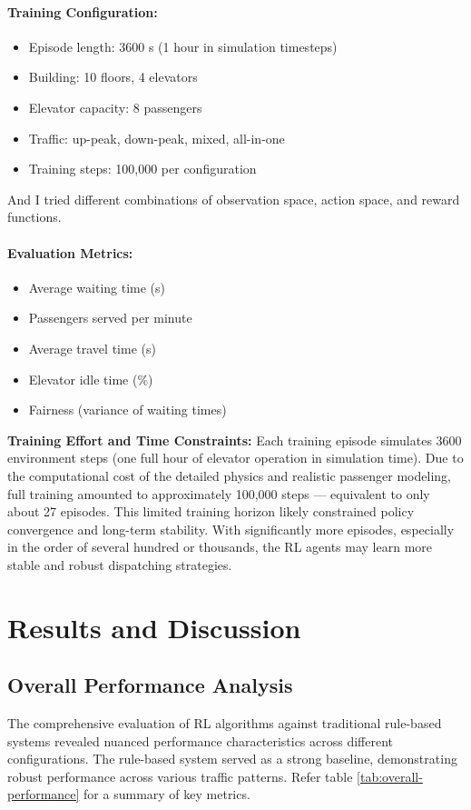 \documentclass[10pt,twocolumn]{article}
\begin{document}
\paragraph{Training Configuration:}
\begin{itemize}
    \item Episode length: 3600 s (1 hour in simulation timesteps)
    \item Building: 10 floors, 4 elevators
    \item Elevator capacity: 8 passengers
    \item Traffic: up-peak, down-peak, mixed, all-in-one
    \item Training steps: 100{,}000 per configuration
\end{itemize}
And I tried different combinations of observation space, action space, and reward functions.

\paragraph{Evaluation Metrics:}
\begin{itemize}
    \item Average waiting time (s)
    \item Passengers served per minute
    \item Average travel time (s)
    \item Elevator idle time (\%)
    \item Fairness (variance of waiting times)
\end{itemize}
\textbf{Training Effort and Time Constraints:}
Each training episode simulates 3600 environment steps (one full hour of elevator operation in simulation time). Due to the computational cost of the detailed physics and realistic passenger modeling, full training amounted to approximately 100,000 steps — equivalent to only about 27 episodes. This limited training horizon likely constrained policy convergence and long-term stability. With significantly more episodes, especially in the order of several hundred or thousands, the RL agents may learn more stable and robust dispatching strategies.
\section{Results and Discussion}

\subsection{Overall Performance Analysis}
The comprehensive evaluation of RL algorithms against traditional rule-based systems revealed nuanced performance characteristics across different configurations. The rule-based system served as a strong baseline, demonstrating robust performance across various traffic patterns. Refer table \ref{tab:overall-performance} for a summary of key metrics.
\end{document}
